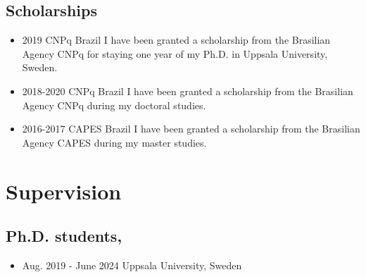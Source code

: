 \documentclass[10pt,A4]{article} %
\begin{document}
\subsection{Scholarships}
 \begin{itemize}
    \item   {}
    { 2019 }
    { CNPq }
    { Brazil }
    { I have been granted a scholarship from the Brasilian Agency CNPq for staying one year of my Ph.D. in Uppsala University, Sweden. }
    \item {}
    { 2018-2020 }
    { CNPq }
    { Brazil }
    { I have been granted a scholarship from the Brasilian Agency CNPq during my doctoral studies. }
    \item {}
    { 2016-2017 }
    { CAPES }
    { Brazil }
    { I have been granted a scholarship from the Brasilian Agency CAPES during my master studies. }

  \end{itemize}


\section{Supervision}


  \subsection{\noindent Ph.D.  students,   }
  \begin{itemize}
    
        \item {}
        { Aug. 2019 - June 2024 }
        { Uppsala University, Sweden }
        {  }
     
  \end{itemize}
\end{document}
